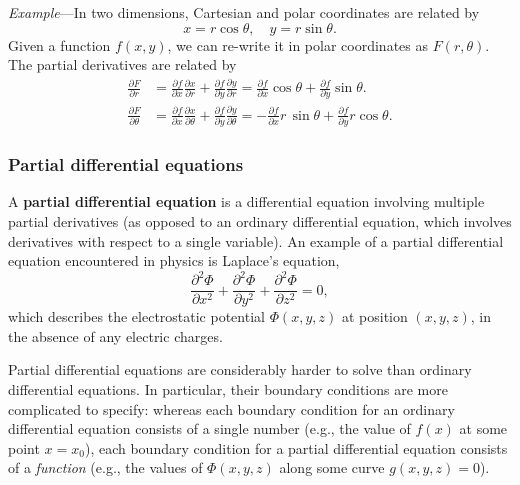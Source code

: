 \documentclass[10pt,a4paper]{article}
\begin{document}
\begin{framed}\noindent
  \textit{Example}---In two dimensions, Cartesian and polar
  coordinates are related by
  \begin{equation}
    x = r\cos\theta, \quad y = r\sin\theta.
  \end{equation}
  Given a function $f(x,y)$, we can re-write it in polar coordinates
  as $F(r,\theta)$.  The partial derivatives are related by
  \begin{align}
    \frac{\partial F}{\partial r} &= \frac{\partial f}{\partial x}
    \frac{\partial x}{\partial r} + \frac{\partial f}{\partial y}
    \frac{\partial y}{\partial r} = \frac{\partial f}{\partial x}
    \cos\theta + \frac{\partial f}{\partial y}
    \sin\theta. \\
    \frac{\partial F}{\partial \theta} &= \frac{\partial f}{\partial
      x} \frac{\partial x}{\partial \theta} + \frac{\partial
      f}{\partial y} \frac{\partial y}{\partial \theta} =
    -\frac{\partial f}{\partial x} r\,\sin\theta + \frac{\partial
      f}{\partial y} r\cos\theta.
  \end{align}
\end{framed}

\subsubsection{Partial differential equations}
\label{partial-differential-equations}

A \textbf{partial differential equation} is a differential equation
involving multiple partial derivatives (as opposed to an ordinary
differential equation, which involves derivatives with respect to a
single variable). An example of a partial differential equation
encountered in physics is Laplace's equation,
\begin{equation}
  \frac{\partial^2 \Phi}{\partial x^2} + \frac{\partial^2 \Phi}{\partial y^2} + \frac{\partial^2 \Phi}{\partial z^2}= 0,
\end{equation}
which describes the electrostatic potential $\Phi(x,y,z)$ at position
$(x,y,z)$, in the absence of any electric charges.

Partial differential equations are considerably harder to solve than
ordinary differential equations. In particular, their boundary
conditions are more complicated to specify: whereas each boundary
condition for an ordinary differential equation consists of a single
number (e.g., the value of $f(x)$ at some point $x = x_0$), each
boundary condition for a partial differential equation consists of a
\emph{function} (e.g., the values of $\Phi(x,y,z)$ along some curve
$g(x,y,z) = 0$).
\end{document}

